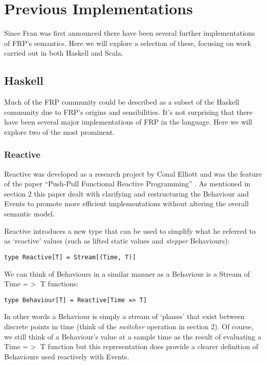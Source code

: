 \chapter{Previous Implementations}
  Since Fran was first announced there have been several further implementations of FRP's semantics. Here
  we will explore a selection of these, focusing on work carried out in both Haskell and Scala.
  
  \section{Haskell}
    Much of the FRP community could be described as a subset of the Haskell community due to FRP's
    origins and sensibilities. It's not surprising that there have been several major implementations
    of FRP in the language. Here we will explore two of the most prominent.
    
    \subsection{Reactive}
      Reactive was developed as a research project by Conal Elliott and was the feature
      of the paper ``Push-Pull Functional Reactive Programming'' \cite{Elliott2009}. As mentioned
      in section 2 this paper dealt with clarifying and restructuring the Behaviour and Events
      to promote more efficient implementations without altering the overall semantic model.
      
      Reactive introduces a new type that can be used to simplify what he referred to as
      `reactive' values (such as lifted static values and \emph{stepper} Behaviours):
    
\begin{verbatim}
type Reactive[T] = Stream[(Time, T)]
\end{verbatim}

      We can think of Behaviours in a similar manner as a Behaviour is
      a Stream of Time =$>$ T functions:
 
\begin{verbatim}
type Behaviour[T] = Reactive[Time => T]
\end{verbatim}      

      In other words a Behaviour is simply a stream of `phases' that exist between discrete
      points in time (think of the \emph{switcher} operation in section 2). Of course, we
      still think of a Behaviour's value at a sample time as the result of evaluating a
      Time =$>$ T function but this representation
      does provide a clearer definition of Behaviours used reactively with Events.
      
